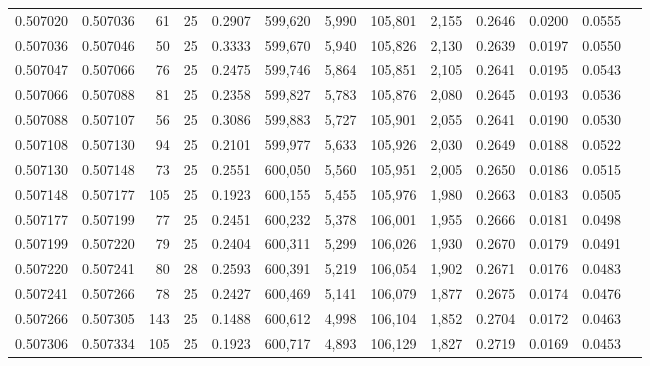 \begin{tabular}{rrrrrrrrrrrrr}
0.507020 & 0.507036 &  61 &  25 &                                     0.2907 & 599,620 &   5,990 & 105,801 &   2,155 & 0.2646 & 0.0200 & 0.0555 \\
0.507036 & 0.507046 &  50 &  25 &                                     0.3333 & 599,670 &   5,940 & 105,826 &   2,130 & 0.2639 & 0.0197 & 0.0550 \\
0.507047 & 0.507066 &  76 &  25 &                                     0.2475 & 599,746 &   5,864 & 105,851 &   2,105 & 0.2641 & 0.0195 & 0.0543 \\
0.507066 & 0.507088 &  81 &  25 &                                     0.2358 & 599,827 &   5,783 & 105,876 &   2,080 & 0.2645 & 0.0193 & 0.0536 \\
0.507088 & 0.507107 &  56 &  25 &                                     0.3086 & 599,883 &   5,727 & 105,901 &   2,055 & 0.2641 & 0.0190 & 0.0530 \\
0.507108 & 0.507130 &  94 &  25 &                                     0.2101 & 599,977 &   5,633 & 105,926 &   2,030 & 0.2649 & 0.0188 & 0.0522 \\
0.507130 & 0.507148 &  73 &  25 &                                     0.2551 & 600,050 &   5,560 & 105,951 &   2,005 & 0.2650 & 0.0186 & 0.0515 \\
0.507148 & 0.507177 & 105 &  25 &                                     0.1923 & 600,155 &   5,455 & 105,976 &   1,980 & 0.2663 & 0.0183 & 0.0505 \\
0.507177 & 0.507199 &  77 &  25 &                                     0.2451 & 600,232 &   5,378 & 106,001 &   1,955 & 0.2666 & 0.0181 & 0.0498 \\
0.507199 & 0.507220 &  79 &  25 &                                     0.2404 & 600,311 &   5,299 & 106,026 &   1,930 & 0.2670 & 0.0179 & 0.0491 \\
0.507220 & 0.507241 &  80 &  28 &                                     0.2593 & 600,391 &   5,219 & 106,054 &   1,902 & 0.2671 & 0.0176 & 0.0483 \\
0.507241 & 0.507266 &  78 &  25 &                                     0.2427 & 600,469 &   5,141 & 106,079 &   1,877 & 0.2675 & 0.0174 & 0.0476 \\
0.507266 & 0.507305 & 143 &  25 &                                     0.1488 & 600,612 &   4,998 & 106,104 &   1,852 & 0.2704 & 0.0172 & 0.0463 \\
0.507306 & 0.507334 & 105 &  25 &                                     0.1923 & 600,717 &   4,893 & 106,129 &   1,827 & 0.2719 & 0.0169 & 0.0453 \\

\end{tabular}
